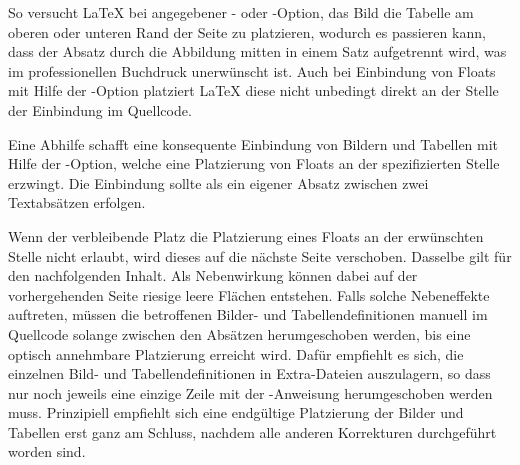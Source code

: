 So versucht \LaTeX{} bei angegebener - oder -Option,
das Bild \bzw die Tabelle am oberen oder unteren Rand der Seite zu platzieren,
wodurch es passieren kann, dass der Absatz durch die Abbildung \etc
mitten in einem Satz aufgetrennt wird, was im professionellen Buchdruck unerwünscht ist.
Auch bei Einbindung von Floats
mit Hilfe der -Option
platziert \LaTeX{} diese nicht unbedingt direkt an der Stelle der Einbindung im Quellcode.
%

Eine Abhilfe schafft eine konsequente Einbindung von Bildern und Tabellen mit Hilfe der -Option,
welche eine Platzierung von Floats an der spezifizierten Stelle erzwingt.
Die Einbindung sollte als ein eigener Absatz zwischen zwei Textabsätzen erfolgen.

Wenn der verbleibende Platz die Platzierung eines Floats an der erwünschten Stelle nicht erlaubt,
wird dieses auf die nächste Seite verschoben. Dasselbe gilt für den nachfolgenden Inhalt.
Als Nebenwirkung können dabei auf der vorhergehenden Seite riesige leere Flächen entstehen.
Falls solche Nebeneffekte auftreten, müssen die betroffenen Bilder- und Tabellendefinitionen
manuell im Quellcode solange zwischen den Absätzen herumgeschoben werden,
bis eine optisch annehmbare Platzierung erreicht wird.
Dafür empfiehlt es sich, die einzelnen Bild- und Tabellendefinitionen in Extra-Dateien auszulagern,
so dass nur noch jeweils eine einzige Zeile mit der -Anweisung herumgeschoben werden muss.
Prinzipiell empfiehlt sich eine endgültige Platzierung der Bilder und Tabellen erst ganz am Schluss,
nachdem alle anderen Korrekturen durchgeführt worden sind.

